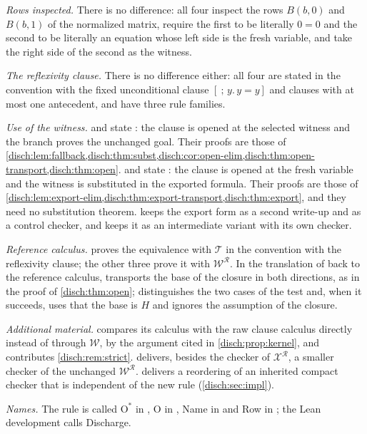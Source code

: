 \begin{remark}
\label{disch:rem:four}
\emph{Rows inspected.} There is no difference: all four inspect the rows
$B(b,0)$ and $B(b,1)$ of the normalized matrix, require the first to be
literally $0=0$ and the second to be literally an equation whose left side
is the fresh variable, and take the right side of the second as the
witness.

\emph{The reflexivity clause.} There is no difference either: all four are
stated in the convention with the fixed unconditional clause
$[\ ;\,y.\,y=y]$ and clauses with at most one antecedent, and have three
rule families.

\emph{Use of the witness.}  and
 state : the clause is opened
at the selected witness and the branch proves the unchanged goal. Their
proofs are those of
\cref{disch:lem:fallback,disch:thm:subst,disch:cor:open-elim,disch:thm:open-transport,disch:thm:open}.
 and  state :
the clause is opened at the fresh variable and the witness is substituted
in the exported formula. Their proofs are those of
\cref{disch:lem:export-elim,disch:thm:export-transport,disch:thm:export},
and they need no substitution theorem.  keeps the
export form as a second write-up and as a control checker, and
 keeps it as an intermediate variant with its
own checker.

\emph{Reference calculus.}  proves the equivalence
with $\mathcal T$ in the convention with the reflexivity clause; the other
three prove it with $\mathcal W^{\mathcal R}$. In the translation of
 back to the reference calculus, 
transports the base of the closure in both directions, as in the proof of
\cref{disch:thm:open};  distinguishes the two
cases of the test and, when it succeeds, uses that the base is $H$ and
ignores the assumption of the closure.

\emph{Additional material.}  compares its calculus
with the raw clause calculus directly instead of through $\mathcal W$, by
the argument cited in \cref{disch:prop:kernel}, and contributes
\cref{disch:rem:strict}.  delivers, besides the
checker of $\mathcal X^{\mathcal R}$, a smaller checker of the unchanged
$\mathcal W^{\mathcal R}$.  delivers a
reordering of an inherited compact checker that is independent of the new
rule (\cref{disch:sec:impl}).

\emph{Names.} The rule is called $\mathrm O^*$ in ,
$\mathrm O$ in , Name in
 and Row in ; the Lean
development calls  Discharge.
\end{remark}

